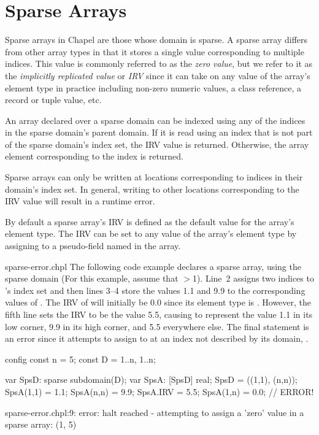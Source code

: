 %
%


\section{Sparse Arrays}
\label{Sparse_Arrays}

Sparse arrays in Chapel are those whose domain is sparse.  A
sparse array differs from other array types in that it stores a single
value corresponding to multiple indices.  This value is commonly
referred to as the \emph{zero value}, but we refer to it as the
\emph{implicitly replicated value} or \emph{IRV} since it can take
on any value of the array's element type in practice including
non-zero numeric values, a class reference, a record or tuple value,
etc.

An array declared over a sparse domain can be indexed using any of the
indices in the sparse domain's parent domain.  If it is read using an
index that is not part of the sparse domain's index set, the IRV value
is returned.  Otherwise, the array element corresponding to the index
is returned.

Sparse arrays can only be written at locations corresponding to
indices in their domain's index set.  In general, writing to other
locations corresponding to the IRV value will result in a runtime
error.

By default a sparse array's IRV is defined as the default value for
the array's element type.  The IRV can be set to any value of the
array's element type by assigning to a pseudo-field named 
in the array.

\begin{chapelexample}{sparse-error.chpl}
The following code example declares a sparse array,  using
the sparse domain  (For this example, assume that
$>$1).  Line~2 assigns two indices to 's index set
and then lines 3--4 store the values 1.1 and 9.9 to the corresponding
values of .  The IRV of  will initially be 0.0
since its element type is .  However, the fifth line sets
the IRV to be the value 5.5, causing  to represent the
value 1.1 in its low corner, 9.9 in its high corner, and 5.5
everywhere else.  The final statement is an error since it attempts to
assign to  at an index not described by its domain,
.

\begin{chapelpre}
config const n = 5;
const D = {1..n, 1..n};
\end{chapelpre}
\begin{chapel}
var SpsD: sparse subdomain(D);
var SpsA: [SpsD] real;
SpsD = ((1,1), (n,n));
SpsA(1,1) = 1.1;
SpsA(n,n) = 9.9;
SpsA.IRV = 5.5;
SpsA(1,n) = 0.0;  // ERROR!
\end{chapel}
\begin{chapeloutput}
sparse-error.chpl:9: error: halt reached - attempting to assign a 'zero' value in a sparse array: (1, 5)
\end{chapeloutput}
\end{chapelexample}



